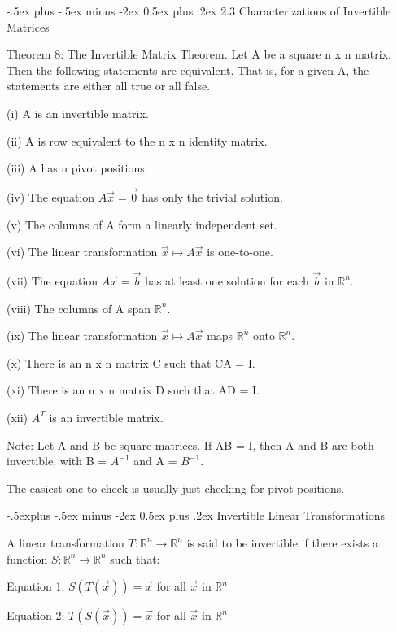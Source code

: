 \documentclass[10pt,landscape]{article}
\makeatletter
\renewcommand{\section}{\@startsection{section}{1}{0mm}%
                                {-.5ex plus -.5ex minus -2ex}%
                                {0.5ex plus .2ex}%
                                {\normalfont\footnotesize\bfseries}}
\renewcommand{\subsection}{\@startsection{subsection}{2}{0mm}%
                                {-.5explus -.5ex minus -2ex}%
                                {0.5ex plus .2ex}%
                                {\normalfont\footnotesize\bfseries}}
\makeatother
\begin{document}
\begin{multicols}{4}
{{\section{2.3 Characterizations of Invertible Matrices}

Theorem 8: The Invertible Matrix Theorem. Let A be a square n x n matrix. Then the following statements are equivalent. That is, for a given A, the statements are either all true or all false.

(i) A is an invertible matrix.

(ii) A is row equivalent to the n x n identity matrix.

(iii) A has n pivot positions.

(iv) The equation $A\vec{x}=\vec{0}$ has only the trivial solution.

(v) The columns of A form a linearly independent set.

(vi) The linear transformation $\vec{x} \mapsto A\vec{x}$ is one-to-one.

(vii) The equation $A\vec{x}=\vec{b}$ has at least one solution for each $\vec{b}$ in $\mathbb{R}^n$.

(viii) The columns of A span $\mathbb{R}^n$. 

(ix) The linear transformation $\vec{x} \mapsto A\vec{x}$ maps $\mathbb{R}^n$ onto $\mathbb{R}^n$.

(x) There is an n x n matrix C such that CA = I.

(xi) There is an n x n matrix D such that AD = I.

(xii) $A^T$ is an invertible matrix.

Note: Let A and B be square matrices. If AB = I, then A and B are both invertible, with B = $A^{-1}$ and A = $B^{-1}$.

The easiest one to check is usually just checking for pivot positions. 

\subsection{Invertible Linear Transformations}

A linear transformation $T \colon \mathbb{R}^n \to \mathbb{R}^n$ is said to be invertible if there exists a function $S \colon \mathbb{R}^n \to \mathbb{R}^n$ such that:

Equation 1: $S(T(\vec{x})) = \vec{x}$ for all $\vec{x}$ in $\mathbb{R}^n$

Equation 2: $T(S(\vec{x})) = \vec{x}$ for all $\vec{x}$ in $\mathbb{R}^n$


}}
\end{multicols}
\end{document}
